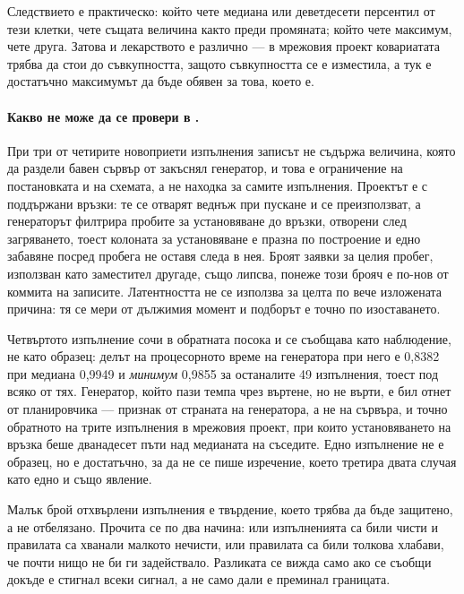 Следствието е практическо: който чете медиана или деветдесети персентил от тези клетки, чете същата
величина както преди промяната; който чете максимум, чете друга. Затова и лекарството е различно —
в мрежовия проект ковариатата трябва да стои до съвкупността, защото съвкупността се е изместила, а
тук е достатъчно максимумът да бъде обявен за това, което е.

\paragraph{Какво не може да се провери в .} При три от четирите новоприети изпълнения
записът не съдържа величина, която да раздели бавен сървър от закъснял генератор, и това е
ограничение на постановката и на схемата, а не находка за самите изпълнения. Проектът е с
поддържани връзки: те се отварят веднъж при пускане и се преизползват, а генераторът филтрира
пробите за установяване до връзки, отворени след загряването, тоест колоната за установяване е
празна по построение и едно забавяне посред пробега не оставя следа в нея. Броят заявки за целия
пробег, използван като заместител другаде, също липсва, понеже този брояч е по-нов от коммита на
записите. Латентността не се използва за целта по вече изложената причина: тя се мери от дължимия
момент и подборът е точно по изоставането.

Четвъртото изпълнение сочи в обратната посока и се съобщава като наблюдение, не като образец: делът
на процесорното време на генератора при него е 0,8382 при медиана 0,9949 и \emph{минимум} 0,9855 за
останалите 49 изпълнения, тоест под всяко от тях. Генератор, който пази темпа чрез въртене, но не
върти, е бил отнет от планировчика — признак от страната на генератора, а не на сървъра, и точно
обратното на трите изпълнения в мрежовия проект, при които установяването на връзка беше
дванадесет пъти над медианата на съседите. Едно изпълнение не е образец, но е достатъчно, за да не
се пише изречение, което третира двата случая като едно и също явление.

Малък брой отхвърлени изпълнения е твърдение, което трябва да бъде защитено, а не
отбелязано. Прочита се по два начина: или изпълненията са били чисти и правилата са хванали
малкото нечисти, или правилата са били толкова хлабави, че почти нищо не би ги задействало.
Разликата се вижда само ако се съобщи докъде е стигнал всеки сигнал, а не само дали е
преминал границата.


